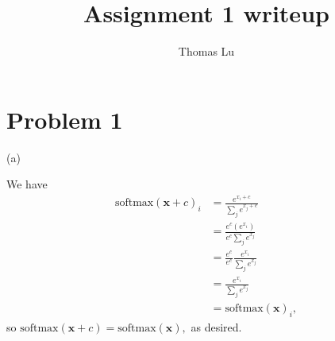 \documentclass{article}
\title{Assignment 1 writeup}
\author{Thomas Lu}
\date{}
\begin{document}
\maketitle
\section{Problem 1}
(a)

We have
\begin{align*}
\text{softmax}(\mathbf{x} + c)_i &= \frac{e^{x_i + c}}{\sum_j e^{x_j + c}}\\
&= \frac{e^c(e^{x_i})}{e^c\sum_j e^{x_j}}\\
&= \frac{e^c}{e^c} \frac{e^{x_i}}{\sum_j e^{x_j}}\\
&= \frac{e^{x_i}}{\sum_je^{x_j}}\\
&= \text{softmax}(\mathbf{x})_i,
\end{align*}
so $\text{softmax}(\mathbf{x} + c) = \text{softmax}(\mathbf{x}),$ as desired.
\end{document}
